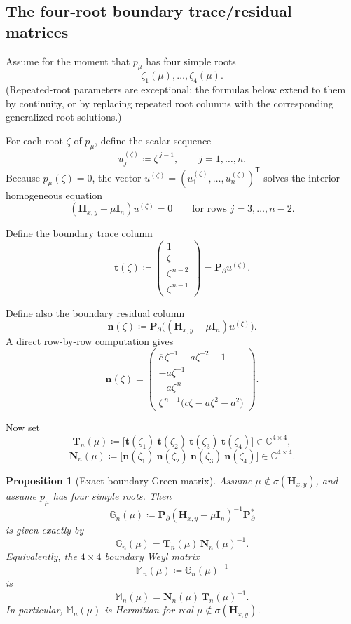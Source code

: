 \documentclass[11pt]{article}
\newtheorem{proposition}[theorem]{Proposition}
\begin{document}
\subsection*{The four-root boundary trace/residual matrices}

Assume for the moment that \(p_\mu\) has four simple roots
\[
\zeta_1(\mu),\dots,\zeta_4(\mu).
\]
(Repeated-root parameters are exceptional; the formulas below extend to them by continuity,
or by replacing repeated root columns with the corresponding generalized root solutions.)

For each root \(\zeta\) of \(p_\mu\), define the scalar sequence
\[
u_j^{(\zeta)}\coloneqq \zeta^{\,j-1},
\qquad
j=1,\dots,n.
\]
Because \(p_\mu(\zeta)=0\), the vector \(u^{(\zeta)}=(u_1^{(\zeta)},\dots,u_n^{(\zeta)})^{\mathsf T}\)
solves the interior homogeneous equation
\[
(\mathbf H_{x,y}-\mu\mathbf I_n)u^{(\zeta)}=0
\qquad\text{for rows }j=3,\dots,n-2.
\]

Define the boundary trace column
\[
\mathbf t(\zeta)\coloneqq
\begin{pmatrix}
1\\
\zeta\\
\zeta^{\,n-2}\\
\zeta^{\,n-1}
\end{pmatrix}
=
\mathbf P_\partial u^{(\zeta)}.
\]

Define also the boundary residual column
\[
\mathbf n(\zeta)\coloneqq
\mathbf P_\partial
\bigl((\mathbf H_{x,y}-\mu\mathbf I_n)u^{(\zeta)}\bigr).
\]
A direct row-by-row computation gives
\[
\mathbf n(\zeta)=
\begin{pmatrix}
\overline c\,\zeta^{-1}-a\zeta^{-2}-1\\[1mm]
-a\zeta^{-1}\\[1mm]
-a\zeta^{\,n}\\[1mm]
\zeta^{\,n-1}\bigl(c\zeta-a\zeta^2-a^2\bigr)
\end{pmatrix}.
\]

Now set
\[
\mathbf T_n(\mu)\coloneqq
\bigl[\mathbf t(\zeta_1)\ \mathbf t(\zeta_2)\ \mathbf t(\zeta_3)\ \mathbf t(\zeta_4)\bigr]
\in\mathbb C^{4\times 4},
\]
\[
\mathbf N_n(\mu)\coloneqq
\bigl[\mathbf n(\zeta_1)\ \mathbf n(\zeta_2)\ \mathbf n(\zeta_3)\ \mathbf n(\zeta_4)\bigr]
\in\mathbb C^{4\times 4}.
\]

\begin{proposition}[Exact boundary Green matrix]\label{prop:four-root-boundary-green}
Assume \(\mu\notin\sigma(\mathbf H_{x,y})\), and assume \(p_\mu\) has four simple roots.
Then
\[
\mathbb G_n(\mu)
\coloneqq
\mathbf P_\partial(\mathbf H_{x,y}-\mu\mathbf I_n)^{-1}\mathbf P_\partial^*
\]
is given exactly by
\[
\boxed{
\mathbb G_n(\mu)=\mathbf T_n(\mu)\,\mathbf N_n(\mu)^{-1}.
}
\]
Equivalently, the \(4\times4\) boundary Weyl matrix
\[
\mathbb M_n(\mu)\coloneqq \mathbb G_n(\mu)^{-1}
\]
is
\[
\boxed{
\mathbb M_n(\mu)=\mathbf N_n(\mu)\,\mathbf T_n(\mu)^{-1}.
}
\]
In particular, \(\mathbb M_n(\mu)\) is Hermitian for real \(\mu\notin\sigma(\mathbf H_{x,y})\).
\end{proposition}
\end{document}
